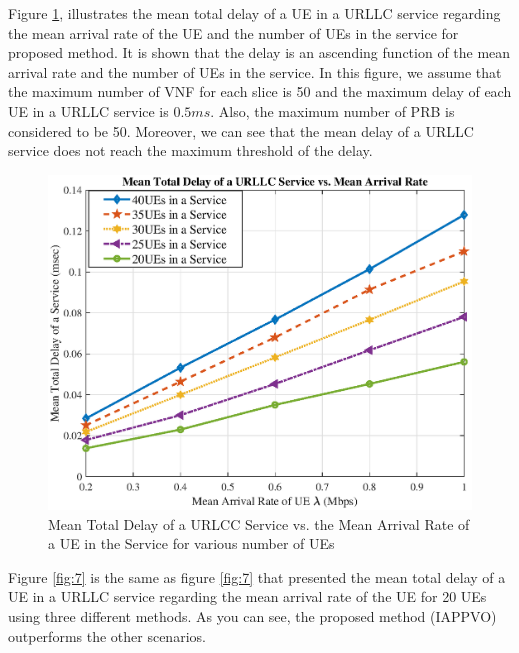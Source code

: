 \documentclass[conference]{IEEEtran}
\begin{document}
Figure \ref{fig:6}, illustrates the mean total delay of a UE in a URLLC service regarding the mean arrival rate of the UE and the number of UEs in the service for proposed method.
It is shown that the delay is an ascending function of the mean arrival rate and the number of UEs in the service. In this figure, we assume that the maximum number of VNF for each slice is 50 and the maximum delay of each UE in a URLLC service is $0.5ms$. Also, the maximum number of PRB is considered to be 50. 
 Moreover, we can see that the mean delay of a URLLC service 
does not reach the maximum threshold of the delay.
\begin{figure}
  \centering 
    \includegraphics[scale = 0.5]{delay_new.eps}
  \caption{Mean Total Delay of a URLCC Service vs. the Mean Arrival Rate of a UE in the Service for various number of UEs}
  \label{fig:6}
\end{figure}
Figure \ref{fig:7} is the same as figure \ref{fig:7} that presented the mean total delay of a UE in a URLLC service regarding the mean arrival rate of the UE for 20 UEs using three different methods. As you can see, the proposed method (IAPPVO) outperforms the other scenarios.
\end{document}
